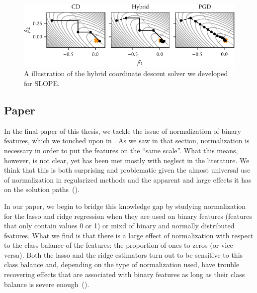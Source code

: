 \begin{figure}[htpb]
  \centering
  \includegraphics[]{figures/illustration_solvers_thesis.pdf}
  \caption{%
    A illustration of the hybrid coordinate descent solver we developed for SLOPE.
  }
  \label{fig:paper5-highlight}
\end{figure}

\subsection{Paper \VI}

In the final paper of this thesis, we tackle the issue of normalization of binary features, which we touched upon in . As we saw in that section, normalization is necessary in order to put the features on the ``same scale''. What this means, however, is not clear, yet has been met mostly with neglect in the literature. We think that this is both surprising and problematic given the almost universal use of normalization in regularized methods and the apparent and large effects it has on the solution paths~().

In our paper, we begin to bridge this knowledge gap by studying normalization for the lasso and ridge regression when they are used on binary features (features that only contain values 0 or 1) or mixd of binary and normally distributed features. What we find is that there is a large effect of normalization with respect to the class balance of the features: the proportion of ones to zeros (or vice versa). Both the lasso and the ridge estimators turn out to be sensitive to this class balance and, depending on the type of normalization used, have trouble recovering effects that are associated with binary features as long as their class balance is severe enough~().

